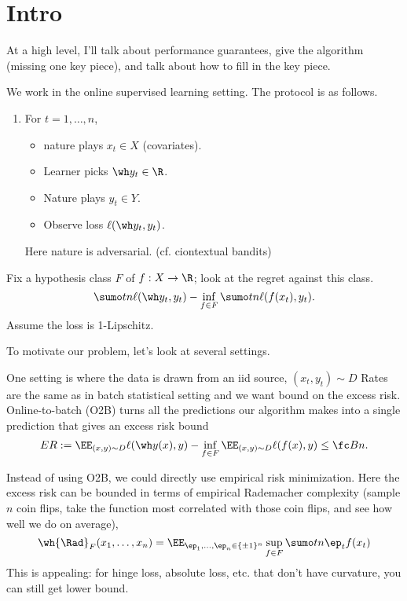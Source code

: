 \section{Intro}

At a high level, I'll talk about performance guarantees, give the algorithm (missing one key piece), and talk about how to fill in the key piece.


We work in the online supervised learning setting. The protocol is as follows. 
\begin{enumerate}
\item
For $t=1,\ldots, n$, 
\begin{itemize}
\item
nature plays $x_t\in X$ (covariates).
\item
Learner picks $\wh y_t\in \R$.
\item
Nature plays $y_t\in Y$. 
\item
Observe loss $\ell(\wh y_t, y_t)$. 
\end{itemize}
Here nature is adversarial. (cf. ciontextual bandits)
\end{enumerate}

Fix a hypothesis class $F$ of $f:X\to \R$; look at the regret against this class. 
$$
\sumo tn \ell(\wh y_t, y_t) - \inf_{f\in F} \sumo tn \ell(f(x_t),y_t).
$$
Assume the loss is 1-Lipschitz.

To motivate our problem, let's look at several settings.

One setting is where the data is drawn from an iid source, $(x_t,y_t)\sim D$
Rates are the same as in batch statistical setting and we want bound on the excess risk. Online-to-batch (O2B) turns all the predictions our algorithm makes into a single prediction that gives an excess risk bound
$$
ER:=\EE_{(x,y)\sim D} 
\ell(\wh y(x),y) - \inf_{f\in F} \EE_{(x,y)\sim D} \ell(f(x),y) \le \fc Bn.
$$

Instead of using O2B, we could directly use empirical risk minimization. Here the excess risk can be bounded in terms of empirical Rademacher complexity (sample $n$ coin flips, take the function most correlated with those coin flips, and see how well we do on average),
$$
\wh{\Rad}_F(x_1,\ldots, x_n) = \EE_{\ep_1,\ldots, \ep_n\in \{\pm1\}^n}
\sup_{f\in F} \sumo tn \ep_t f(x_t)
$$
This is appealing: for hinge loss, absolute loss, etc. that don't have curvature, you can still get lower bound.

